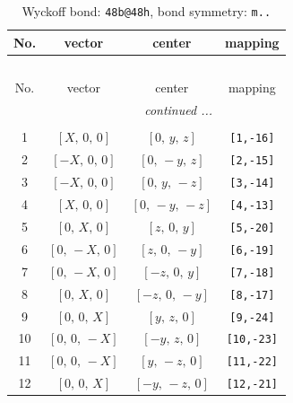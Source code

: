 \documentclass[fleqn,8pt]{jsarticle}
\begin{document}
\begin{longtable}{cccc}
\caption{Wyckoff bond: {\tt 48b@48h}, bond symmetry: {\tt m..}}
 \\
 \hline \hline
No. & vector & center & mapping \\ \hline \endfirsthead

\multicolumn{3}{l}{\tablename\ \thetable{}} \\
 \hline \hline
No. & vector & center & mapping \\ \hline \endhead

 \hline \hline
\multicolumn{3}{r}{\footnotesize\it continued ...} \\ \endfoot

 \hline \hline
\multicolumn{3}{r}{} \\ \endlastfoot

1 & $\left[ X,\, 0,\, 0 \right]$ & $\left[ 0,\, y,\, z \right]$ & {\tt [1,-16]} \\ \hline
2 & $\left[ - X,\, 0,\, 0 \right]$ & $\left[ 0,\, - y,\, z \right]$ & {\tt [2,-15]} \\ \hline
3 & $\left[ - X,\, 0,\, 0 \right]$ & $\left[ 0,\, y,\, - z \right]$ & {\tt [3,-14]} \\ \hline
4 & $\left[ X,\, 0,\, 0 \right]$ & $\left[ 0,\, - y,\, - z \right]$ & {\tt [4,-13]} \\ \hline
5 & $\left[ 0,\, X,\, 0 \right]$ & $\left[ z,\, 0,\, y \right]$ & {\tt [5,-20]} \\ \hline
6 & $\left[ 0,\, - X,\, 0 \right]$ & $\left[ z,\, 0,\, - y \right]$ & {\tt [6,-19]} \\ \hline
7 & $\left[ 0,\, - X,\, 0 \right]$ & $\left[ - z,\, 0,\, y \right]$ & {\tt [7,-18]} \\ \hline
8 & $\left[ 0,\, X,\, 0 \right]$ & $\left[ - z,\, 0,\, - y \right]$ & {\tt [8,-17]} \\ \hline
9 & $\left[ 0,\, 0,\, X \right]$ & $\left[ y,\, z,\, 0 \right]$ & {\tt [9,-24]} \\ \hline
10 & $\left[ 0,\, 0,\, - X \right]$ & $\left[ - y,\, z,\, 0 \right]$ & {\tt [10,-23]} \\ \hline
11 & $\left[ 0,\, 0,\, - X \right]$ & $\left[ y,\, - z,\, 0 \right]$ & {\tt [11,-22]} \\ \hline
12 & $\left[ 0,\, 0,\, X \right]$ & $\left[ - y,\, - z,\, 0 \right]$ & {\tt [12,-21]} \\
\end{longtable}
\renewcommand{\arraystretch}{1.2}
\end{document}
